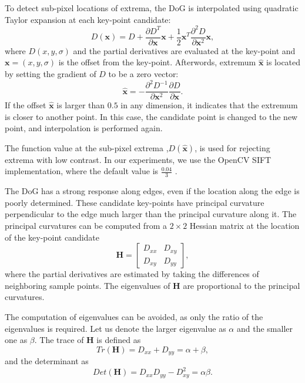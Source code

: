 To detect sub-pixel locations of extrema, the DoG is interpolated using quadratic Taylor expansion at each key-point candidate:
\begin{equation}
    D(\boldsymbol{x}) = D + \frac{\partial D^T}{\partial \boldsymbol{x}}\boldsymbol{x}+\frac{1}{2}\boldsymbol{x}^T\frac{\partial^2 D}{\partial \boldsymbol{x}^2}\boldsymbol{x},
    \label{eq:taylor_expansion}
\end{equation}
where \( D(x,y,\sigma) \) and the partial derivatives are evaluated at the key-point and \( \boldsymbol{x}=(x,y,\sigma) \) is the offset from the key-point. Afterwords, extremum \( \hat{\boldsymbol{x}} \) is located by setting the gradient of \( D \) to be a zero vector:
\begin{equation}
    \hat{\boldsymbol{x}} = - \frac{\partial^2 D^{-1}}{\partial \boldsymbol{x}^2}\frac{\partial D}{\partial \boldsymbol{x}}.
    \label{eq:taylor_extremum}
\end{equation}
If the offset \( \hat{\boldsymbol{x}} \) is larger than \( 0.5 \) in any dimension, it indicates that the extremum is closer to another point. In this case, the candidate point is changed to the new point, and interpolation is performed again.

The function value at the sub-pixel extrema ,$D(\hat{\boldsymbol{x}})$, is used for rejecting extrema with low contrast. In our experiments, we use the OpenCV SIFT implementation, where the default value is $\frac{0.04}{3}$ \cite{openCV}.

The DoG has a strong response along edges, even if the location along the edge is poorly determined. These candidate key-points have principal curvature perpendicular to the edge much larger than the principal curvature along it. The principal curvatures can be computed from a $2\times2$ Hessian matrix at the location of the key-point candidate
\begin{equation}
    \boldsymbol{H} =
    \begin{bmatrix}
        D_{xx} & D_{xy}\\
        D_{xy} & D_{yy}
    \end{bmatrix},
    \label{eq:hessian}
\end{equation}
where the partial derivatives are estimated by taking the differences of neighboring sample points. The eigenvalues of $\boldsymbol{H}$ are proportional to the principal curvatures.

The computation of eigenvalues can be avoided, as only the ratio of the eigenvalues is required. Let us denote the larger eigenvalue as $\alpha$ and the smaller one as $\beta$. The trace of $\boldsymbol{H}$ is defined as
\begin{equation}
    Tr(\boldsymbol{H}) = D_{xx}+D_{yy} = \alpha+\beta,
\end{equation}
and the determinant as
\begin{equation}
    Det(\boldsymbol{H}) = D_{xx}D_{yy}-D_{xy}^2 = \alpha\beta.
\end{equation}

